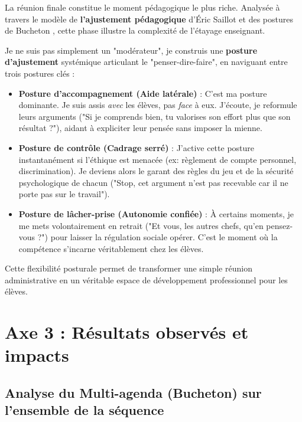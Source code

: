 La réunion finale constitue le moment pédagogique le plus riche. Analysée à travers le modèle de \textbf{l'ajustement pédagogique} d'Éric Saillot et des postures de Bucheton \parencite{saillot_ajustement,bucheton_postures}, cette phase illustre la complexité de l'étayage enseignant.

Je ne suis pas simplement un "modérateur", je construis une \textbf{posture d'ajustement} systémique articulant le "penser-dire-faire", en naviguant entre trois postures clés :

\begin{itemize}[leftmargin=*]
    \item \textbf{Posture d'accompagnement (Aide latérale)} : C'est ma posture dominante. Je suis assis \textit{avec} les élèves, pas \textit{face} à eux. J'écoute, je reformule leurs arguments ("Si je comprends bien, tu valorises son effort plus que son résultat ?"), aidant à expliciter leur pensée sans imposer la mienne.

    \item \textbf{Posture de contrôle (Cadrage serré)} : J'active cette posture instantanément si l'éthique est menacée (ex: règlement de compte personnel, discrimination). Je deviens alors le garant des règles du jeu et de la sécurité psychologique de chacun ("Stop, cet argument n'est pas recevable car il ne porte pas sur le travail").

    \item \textbf{Posture de lâcher-prise (Autonomie confiée)} : À certains moments, je me mets volontairement en retrait ("Et vous, les autres chefs, qu'en pensez-vous ?") pour laisser la régulation sociale opérer. C'est le moment où la compétence s'incarne véritablement chez les élèves.
\end{itemize}

Cette flexibilité posturale permet de transformer une simple réunion administrative en un véritable espace de développement professionnel pour les élèves.

\section{Axe 3 : Résultats observés et impacts}

\subsection{Analyse du Multi-agenda (Bucheton) sur l'ensemble de la séquence}

